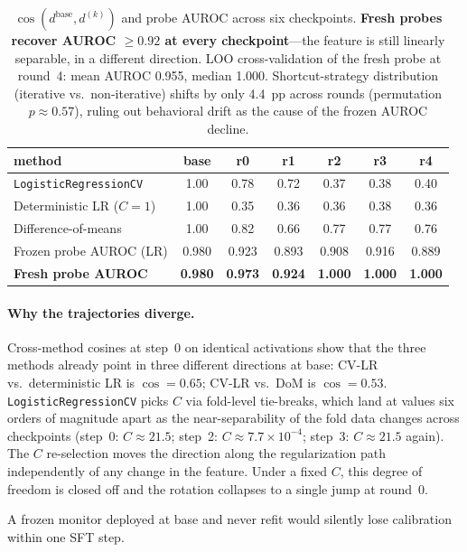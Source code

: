 \documentclass[11pt]{article}
\newcommand{\cossim}{\ensuremath{\cos}}
\newcommand{\dbase}{\ensuremath{d^{\mathrm{base}}}}
\newcommand{\dk}{\ensuremath{d^{(k)}}}
\begin{document}
\begin{table}[h]
\centering
\small
\begin{tabular}{l cccccc}
\toprule
method & base & r0 & r1 & r2 & r3 & r4 \\
\midrule
\texttt{Logistic\-Regression\-CV} & 1.00 & 0.78 & 0.72 & 0.37 & 0.38 & 0.40 \\
Deterministic LR ($C{=}1$)       & 1.00 & 0.35 & 0.36 & 0.36 & 0.38 & 0.36 \\
Difference-of-means              & 1.00 & 0.82 & 0.66 & 0.77 & 0.77 & 0.76 \\
\midrule
Frozen probe AUROC (LR)          & 0.980 & 0.923 & 0.893 & 0.908 & 0.916 & 0.889 \\
\textbf{Fresh probe AUROC}                & \textbf{0.980} & \textbf{0.973} & \textbf{0.924} & \textbf{1.000} & \textbf{1.000} & \textbf{1.000} \\
\bottomrule
\end{tabular}
\caption{$\cossim(\dbase, \dk)$ and probe AUROC across six checkpoints.
\textbf{Fresh probes recover AUROC $\geq 0.92$ at every checkpoint}---the
feature is still linearly separable, in a different direction. LOO
cross-validation of the fresh probe at round~4: mean AUROC 0.955,
median 1.000. Shortcut-strategy distribution (iterative vs.\
non-iterative) shifts by only 4.4~pp across rounds (permutation
$p \approx 0.57$), ruling out behavioral drift as the cause of the
frozen AUROC decline.}
\label{tab:drift}
\end{table}

\paragraph{Why the trajectories diverge.} Cross-method cosines at
step~0 on identical activations show that the three methods already
point in three different directions at base: CV-LR vs.\ deterministic
LR is $\cossim{=}0.65$; CV-LR vs.\ DoM is $\cossim{=}0.53$.
\texttt{LogisticRegressionCV} picks $C$ via fold-level tie-breaks,
which land at values six orders of magnitude apart as the
near-separability of the fold data changes across checkpoints (step~0:
$C \approx 21.5$; step~2: $C \approx 7.7 \times 10^{-4}$; step~3: $C
\approx 21.5$ again). The $C$ re-selection moves the direction along
the regularization path independently of any change in the feature.
Under a fixed $C$, this degree of freedom is closed off and the
rotation collapses to a single jump at round~0.

A frozen monitor deployed at base and never refit would silently
lose calibration within one SFT step.
\end{document}
